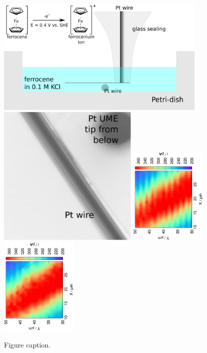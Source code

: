 \documentclass[a4paper, 11pt, oneside, bibliography=totoc]{article}
\begin{document}
\begin{figure}
        \centering
        \includegraphics[width=0.9\textwidth]{wire.eps}
        \includegraphics[width=0.6\textwidth]{wire_photo.eps}
 \includegraphics[trim = 10mm 30mm 0mm 20mm, clip, width=0.33\textwidth, angle=-90]{7.eps}\includegraphics[trim = 10mm 30mm 0mm 20mm, clip, width=0.33\textwidth, angle=-90]{7_deconvoluted.eps}
\caption{Figure caption.}
\label{fig:wire_result}
\end{figure}
\end{document}
